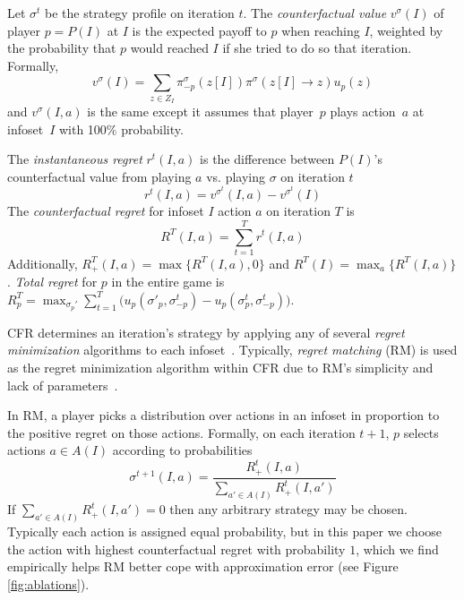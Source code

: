 \documentclass{article}
\newcommand{\adam}[1]{\textbf{\textcolor{magenta}{#1}}}
\begin{document}

Let $\sigma^t$ be the strategy profile on iteration $t$.  The \emph{counterfactual value} $v^{\sigma}(I)$ of player $p=P(I)$ at $I$ is the expected payoff to $p$ when reaching $I$, weighted by the probability that $p$ would reached $I$ if she tried to do so that iteration. Formally,
\begin{equation}
\label{def:v}
v^\sigma(I) = \sum_{z\in Z_I} \pi_{-p}^\sigma(z[I])\pi^\sigma(z[I] \to z) u_p(z)
\end{equation}
and $v^\sigma(I,a)$ is the same except it assumes that player~$p$ plays action~$a$ at infoset~$I$ with 100\% probability.

The {\em instantaneous regret} $r^t(I,a)$ is the difference between $P(I)$'s counterfactual value from playing $a$ vs. playing $\sigma$ on iteration $t$
\begin{equation}
r^t(I,a) = v^{\sigma^t}(I,a) - v^{\sigma^t}(I)
\label{eq:instant}
\end{equation}
The {\em counterfactual regret} for infoset $I$ action $a$ on iteration $T$ is
\begin{equation}
R^T(I,a) = \sum_{t = 1}^T r^t(I,a)
\label{eq:regret}
\end{equation}
Additionally, $R^T_+(I,a) = \max\{R^T(I,a), 0 \}$ and $R^T(I) = \max_a\{R^T(I,a)\}$. \emph{Total regret}
for $p$ in the entire game is
$R_p^T = \max_{\sigma_p'} \sum_{t = 1}^T \big(u_p(\sigma'_p, \sigma_{-p}^t) - u_p(\sigma^t_p, \sigma_{-p}^t)\big)$.

CFR determines an iteration's strategy by applying any of several \emph{regret minimization} algorithms to each infoset~\cite{Littlestone94:Weighted,Chaudhuri09:Parameter-free}.  Typically, {\em regret matching} (RM) is used as the regret minimization algorithm within CFR due to RM's simplicity and lack of parameters~\cite{Hart00:Simple}.

In RM, a player picks a distribution over actions in an infoset in proportion to the positive regret on those actions. Formally, on each iteration $t+1$, $p$ selects actions $a \in A(I)$ according to probabilities
\begin{equation}
\sigma^{t+1}(I,a) =
\frac{R^t_+(I,a)}{\sum_{a' \in A(I)}R_+^t(I,a')}
\label{eq:rm}
\end{equation}
If $\sum_{a' \in A(I)}R_+^t(I,a') = 0$ then any arbitrary strategy may be chosen. Typically each action is assigned equal probability, but in this paper we choose the action with highest counterfactual regret with probability $1$, which we find empirically helps RM better cope with approximation error (see Figure \ref{fig:ablations}).
\end{document}
